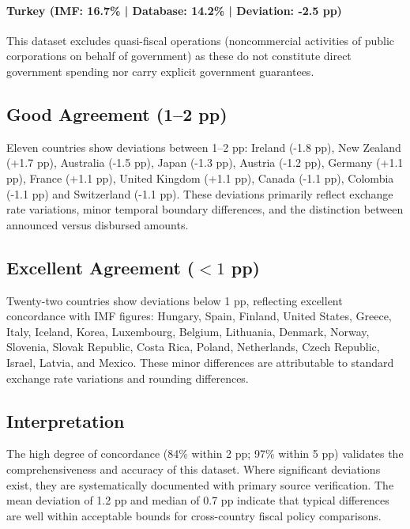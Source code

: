 \documentclass[12pt]{article}
\begin{document}
\paragraph{Turkey (IMF: 16.7\% | Database: 14.2\% | Deviation: -2.5 pp)}

This dataset excludes quasi-fiscal operations (noncommercial activities of public corporations on behalf of government) as these do not constitute direct government spending nor carry explicit government guarantees.

\subsection{Good Agreement (1--2 pp)}

Eleven countries show deviations between 1--2 pp: Ireland (-1.8 pp), New Zealand (+1.7 pp), Australia (-1.5 pp), Japan (-1.3 pp), Austria (-1.2 pp), Germany (+1.1 pp), France (+1.1 pp), United Kingdom (+1.1 pp), Canada (-1.1 pp), Colombia (-1.1 pp) and Switzerland (-1.1 pp). These deviations primarily reflect exchange rate variations, minor temporal boundary differences, and the distinction between announced versus disbursed amounts.

\subsection{Excellent Agreement ($<1$ pp)}

Twenty-two countries show deviations below 1 pp, reflecting excellent concordance with IMF figures: Hungary, Spain, Finland, United States, Greece, Italy, Iceland, Korea, Luxembourg, Belgium, Lithuania, Denmark, Norway, Slovenia, Slovak Republic, Costa Rica, Poland, Netherlands, Czech Republic, Israel, Latvia, and Mexico. These minor differences are attributable to standard exchange rate variations and rounding differences.

\subsection{Interpretation}

The high degree of concordance (84\% within 2 pp; 97\% within 5 pp) validates the comprehensiveness and accuracy of this dataset. Where significant deviations exist, they are systematically documented with primary source verification. The mean deviation of 1.2 pp and median of 0.7 pp indicate that typical differences are well within acceptable bounds for cross-country fiscal policy comparisons.
\end{document}
